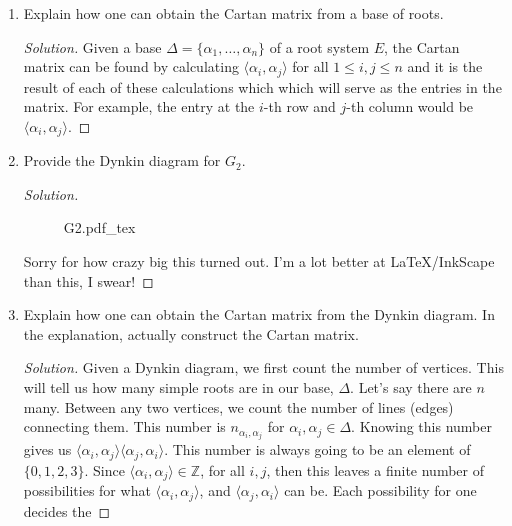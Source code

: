 \documentclass[12pt]{article}
\theoremstyle{definition}
\newcommand{\incfig}[1]{%
    \def\svgwidth{\columnwidth}
    {#1.pdf_tex}
}
\newenvironment{solution}
  {\renewcommand\qedsymbol{$\blacksquare$}\begin{proof}[Solution]}
  {\end{proof}}
\begin{document}
\begin{enumerate}
\begin{enumerate}[label=(\Alph*)]
\begin{solution}
            \end{solution}
        \item Explain how one can obtain the Cartan matrix from a base of
            roots.
            \begin{solution}
                Given a base $\Delta=\{\alpha_1, \dots, \alpha_n\}$ of a root
                system $E$, the Cartan matrix can be found by calculating
                $\langle\alpha_i, \alpha_j\rangle$ for all $1\leq i, j\leq n$
                and it is the result of each of these calculations which which
                will serve as the entries in the matrix. For example, the entry
                at the $i$-th row and $j$-th column would be $\langle\alpha_i,
                \alpha_j\rangle$.
            \end{solution}
        \item Provide the Dynkin diagram for $G_2$.
            \begin{solution}\hfill\par
                \begin{figure}[htp!]
                    \incfig{G2}
               \end{figure}\hfill\par
               Sorry for how crazy big this turned out. I'm a lot better at
               LaTeX/InkScape than this, I swear!
            \end{solution}
        \item Explain how one can obtain the Cartan matrix from the Dynkin
            diagram. In the explanation, actually construct the Cartan matrix. 
            \begin{solution}
                Given a Dynkin diagram, we first count the number of vertices.
                This will tell us how many simple roots are in our base,
                $\Delta$. Let's
                say there are $n$ many. Between any two vertices, we count the
                number of lines (edges) connecting them. This number is
                $n_{\alpha_i, \alpha_j}$ for $\alpha_i, \alpha_j\in\Delta$.
                Knowing this number gives us $\langle\alpha_i,
                \alpha_j\rangle\langle\alpha_j, \alpha_i\rangle$. This number
                is always going to be an element of $\{0, 1, 2, 3\}$. Since
                $\langle\alpha_i, \alpha_j\rangle\in\mathbb{Z}$, for all $i,
                j$, then this leaves a finite number of possibilities for what
                $\langle\alpha_i, \alpha_j\rangle$, and $\langle\alpha_j,
                \alpha_i\rangle$ can be. Each possibility for one decides the

\end{solution}
\end{enumerate}
\end{enumerate}
\end{document}
